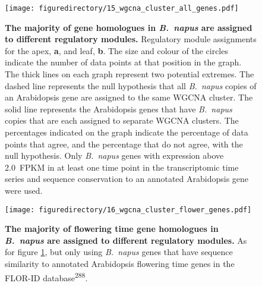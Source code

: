 \documentclass[12pt,]{book}
\begin{document}
\begin{figure}[htbp]
\centering
\texttt{[image: figuredirectory/15\_wgcna\_cluster\_all\_genes.pdf]}
\caption{\textbf{The majority of gene homologues in \emph{B.~napus} are
assigned to different regulatory modules.} Regulatory module assignments
for the apex, \textbf{a}, and leaf, \textbf{b}. The size and colour of
the circles indicate the number of data points at that position in the
graph. The thick lines on each graph represent two potential extremes.
The dashed line represents the null hypothesis that all \emph{B.~napus}
copies of an Arabidopsis gene are assigned to the same WGCNA cluster.
The solid line represents the Arabidopsis genes that have
\emph{B.~napus} copies that are each assigned to separate WGCNA
clusters. The percentages indicated on the graph indicate the percentage
of data points that agree, and the percentage that do not agree, with
the null hypothesis. Only \emph{B.~napus} genes with expression above
2.0~FPKM in at least one time point in the transcriptomic time series
and sequence conservation to an annotated Arabidopsis gene were
used.}\label{figure:215:wgcnaall}
\end{figure}

\begin{figure}[htbp]
\centering
\texttt{[image: figuredirectory/16\_wgcna\_cluster\_flower\_genes.pdf]}
\caption{\textbf{The majority of flowering time gene homologues in
\emph{B.~napus} are assigned to different regulatory modules.} As for
figure \ref{figure:215:wgcnaall}, but only using \emph{B.~napus} genes
that have sequence similarity to annotated Arabidopsis flowering time
genes in the FLOR-ID
database\textsuperscript{288}.}\label{figure:216:wgcnaflower}
\end{figure}
\end{document}
